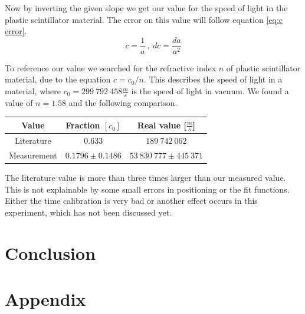 \documentclass[]{article}
\begin{document}
Now by inverting the given slope we get our value for the speed of light in the plastic scintillator material. The error on this value will follow equation \ref{eq:c error}.
\begin{equation} \label{eq:c error}
c=\frac{1}{a}\:,\: dc=\frac{da}{a^2}
\end{equation}

To reference our value we searched for the refractive index $n$ of plastic scintillator material, due to the equation $ c= c_0 / n$. This describes the speed of light in a material, where $c_0 = 299\ 792\ 458 \frac{m}{s}$ is the speed of light in vacuum. We found a value of $n=1.58$ \cite{refractive index} and the following comparison.

\begin{table}[H]
\centering
\begin{tabular}{c|c|c}
Value & Fraction $[c_0]$ & Real value [$\frac{m}{s}$] \\ \hline \hline
Literature & $0.633$ & $189\ 742\ 062$  \\ \hline
Measurement & $0.1796 \pm 0.1486$ & $ 53\ 830\ 777 \pm 445\ 371$ \\ \hline
\end{tabular}
\end{table}

The literature value is more than three times larger than our measured value. This is not explainable by some small errors in positioning or the fit functions. Either the time calibration is very bad or another effect occurs in this experiment, which has not been discussed yet.




\section{Conclusion} %



\section{Appendix}\label{appendix}
\end{document}
